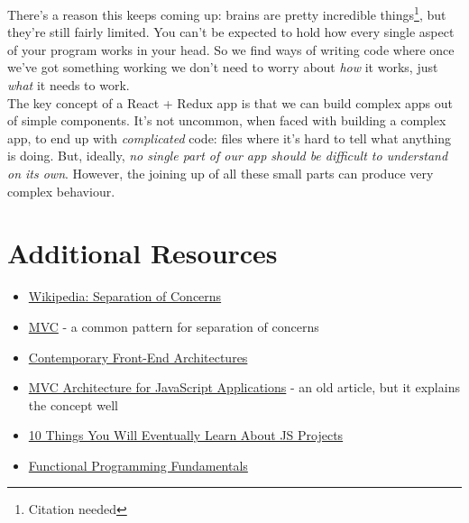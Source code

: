 There's a reason this keeps coming up: brains are pretty incredible things\footnote{Citation needed}, but they're still fairly limited. You can't be expected to hold how every single aspect of your program works in your head. So we find ways of writing code where once we've got something working we don't need to worry about \textit{how} it works, just \textit{what} it needs to work.
\\

The key concept of a React + Redux app is that we can build complex apps out of simple components. It's not uncommon, when faced with building a complex app, to end up with \textit{complicated} code: files where it's hard to tell what anything is doing. But, ideally, \textit{no single part of our app should be difficult to understand on its own}. However, the joining up of all these small parts can produce very complex behaviour.



\pagebreak

\section{Additional Resources}

\begin{itemize}[leftmargin=*]
    \item \href{https://en.wikipedia.org/wiki/Separation_of_concerns}{Wikipedia: Separation of Concerns}
    \item \href{https://en.wikipedia.org/wiki/Model–view–controller}{MVC} - a common pattern for separation of concerns
    \item \href{https://blog.webf.zone/contemporary-front-end-architectures-fb5b500b0231}{Contemporary Front-End Architectures}
    \item \href{http://peter.michaux.ca/articles/mvc-architecture-for-javascript-applications}{MVC Architecture for JavaScript Applications} - an old article, but it explains the concept well
    \item \href{https://blog.usejournal.com/10-things-you-will-eventually-learn-about-javascript-projects-efd7646b958a}{10 Things You Will Eventually Learn About JS Projects}
    \item \href{https://www.matthewgerstman.com/functional-programming-fundamentals/}{Functional Programming Fundamentals}
\end{itemize}

